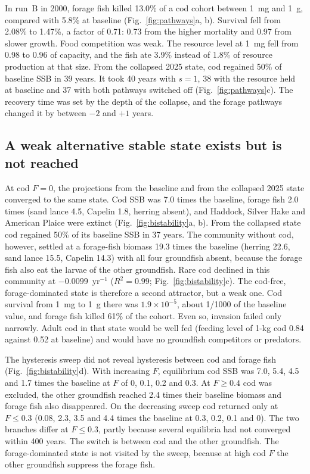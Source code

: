 \documentclass[12pt,letterpaper,fleqn]{article}
\newcommand{\yr}{yr$^{-1}$}
\begin{document}
In run~B in 2000, forage fish killed 13.0\% of a cod cohort between 1~mg and 1~g, compared with 5.8\% at baseline (Fig.~\ref{fig:pathways}a, b). Survival fell from 2.08\% to 1.47\%, a factor of 0.71: 0.73 from the higher mortality and 0.97 from slower growth. Food competition was weak. The resource level at 1~mg fell from 0.98 to 0.96 of capacity, and the fish ate 3.9\% instead of 1.8\% of resource production at that size. From the collapsed 2025 state, cod regained 50\% of baseline SSB in 39 years. It took 40 years with $s=1$, 38 with the resource held at baseline and 37 with both pathways switched off (Fig.~\ref{fig:pathways}c). The recovery time was set by the depth of the collapse, and the forage pathways changed it by between $-2$ and $+1$ years.

\subsection{A weak alternative stable state exists but is not reached}

At cod $F=0$, the projections from the baseline and from the collapsed 2025 state converged to the same state. Cod SSB was 7.0 times the baseline, forage fish 2.0 times (sand lance 4.5, Capelin 1.8, herring absent), and Haddock, Silver Hake and American Plaice were extinct (Fig.~\ref{fig:bistability}a, b). From the collapsed state cod regained 50\% of its baseline SSB in 37 years. The community without cod, however, settled at a forage-fish biomass 19.3 times the baseline (herring 22.6, sand lance 15.5, Capelin 14.3) with all four groundfish absent, because the forage fish also eat the larvae of the other groundfish. Rare cod declined in this community at $-0.0099$~\yr{} ($R^{2}=0.99$; Fig.~\ref{fig:bistability}c). The cod-free, forage-dominated state is therefore a second attractor, but a weak one. Cod survival from 1~mg to 1~g there was $1.9\times10^{-5}$, about 1/1000 of the baseline value, and forage fish killed 61\% of the cohort. Even so, invasion failed only narrowly. Adult cod in that state would be well fed (feeding level of 1-kg cod 0.84 against 0.52 at baseline) and would have no groundfish competitors or predators.

The hysteresis sweep did not reveal hysteresis between cod and forage fish (Fig.~\ref{fig:bistability}d). With increasing $F$, equilibrium cod SSB was 7.0, 5.4, 4.5 and 1.7 times the baseline at $F$ of 0, 0.1, 0.2 and 0.3. At $F\geq0.4$ cod was excluded, the other groundfish reached 2.4 times their baseline biomass and forage fish also disappeared. On the decreasing sweep cod returned only at $F\leq0.3$ (0.08, 2.3, 3.5 and 4.4 times the baseline at 0.3, 0.2, 0.1 and 0). The two branches differ at $F\leq0.3$, partly because several equilibria had not converged within 400 years. The switch is between cod and the other groundfish. The forage-dominated state is not visited by the sweep, because at high cod $F$ the other groundfish suppress the forage fish.
\end{document}
